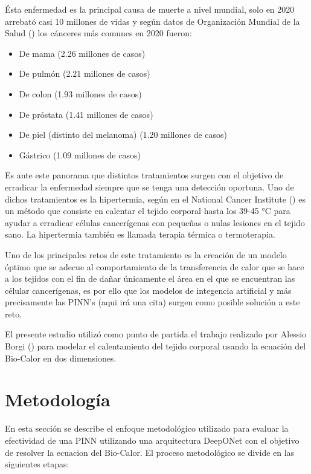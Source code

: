 \documentclass[
  spanish,
  us-letterpaper,
  DIV=11,
  numbers=noendperiod]{scrreprt}
\providecommand{\tightlist}{%
  \setlength{\itemsep}{0pt}\setlength{\parskip}{0pt}}
\begin{document}
Ésta enfermedad es la principal causa de muerte a nivel mundial, solo en
2020 arrebató casi 10 millones de vidas y según datos de Organización
Mundial de la Salud () los cánceres más
comunes en 2020 fueron:

\begin{itemize}
\tightlist
\item
  De mama (2.26 millones de casos)
\item
  De pulmón (2.21 millones de casos)
\item
  De colon (1.93 millones de casos)
\item
  De próstata (1.41 millones de casos)
\item
  De piel (distinto del melanoma) (1.20 millones de casos)
\item
  Gástrico (1.09 millones de casos)
\end{itemize}

Es ante este panorama que distintos tratamientos surgen con el objetivo
de erradicar la enfermedad siempre que se tenga una detección oportuna.
Uno de dichos tratamientos es la hipertermia, según en el National
Cancer Institute () es un método que
consiste en calentar el tejido corporal hasta los 39-45 °C para ayudar a
erradicar células cancerígenas con pequeñas o nulas lesiones en el
tejido sano. La hipertermia también es llamada terapia térmica o
termoterapia.

Uno de los principales retos de este tratamiento es la creación de un
modelo óptimo que se adecue al comportamiento de la transferencia de
calor que se hace a los tejidos con el fin de dañar únicamente el área
en el que se encuentran las célular cancerígenas, es por ello que los
modelos de integencia artificial y más precisamente las PINN's (aqui irá
una cita) surgen como posible solución a este reto.

El presente estudio utilizó como punto de partida el trabajo realizado
por Alessio Borgi () para modelar el
calentamiento del tejido corporal usando la ecuación del Bio-Calor en
dos dimensiones.

\chapter{Metodología}\label{metodologuxeda}

En esta sección se describe el enfoque metodológico utilizado para
evaluar la efectividad de una PINN utilizando una arquitectura DeepONet
con el objetivo de resolver la ecuacion del Bio-Calor. El proceso
metodológico se divide en las siguientes etapas:
\end{document}
